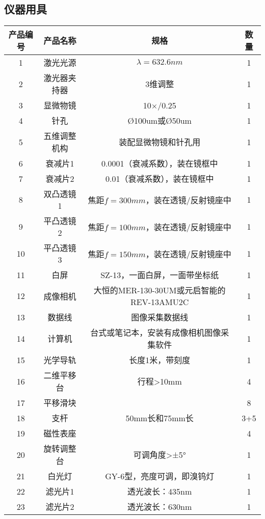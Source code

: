 \documentclass[dvipsnames, svgnames,a4paper,11pt]{article}
\begin{document}
	\subsection{仪器用具}
	\begin{table}[htbp]
		\centering
		\begin{tabular}{|c|c|c|c|}
			\hline
			产品编号 & 产品名称 & 规格 & 数量 \\
			\hline
			1 & 激光光源 & $\lambda =632.6nm$ & 1 \\
			2 & 激光器夹持器 & 3维调整 & 1 \\
			3 & 显微物镜 & 10×/0.25 & 1 \\
			4 & 针孔 & Ø100um或Ø50um & 1 \\
			5 & 五维调整机构 & 装配显微物镜和针孔用 & 1 \\
			6 & 衰减片1 & 0.0001（衰减系数），装在镜框中 & 1 \\
			7 & 衰减片2 & 0.01（衰减系数），装在镜框中 & 1 \\
			8 & 双凸透镜1 & 焦距$f=300mm$，装在透镜/反射镜座中 & 1 \\
			9 & 平凸透镜2 & 焦距$f=100mm$，装在透镜/反射镜座中 & 1 \\
			10 & 平凸透镜3 & 焦距$f=150mm$，装在透镜/反射镜座中 & 1 \\
			11 & 白屏 & SZ-13，一面白屏，一面带坐标纸 & 1 \\
			12 & 成像相机 & 大恒的MER-130-30UM或元启智能的REV-13AMU2C & 1 \\
			13 & 数据线 & 图像采集数据线 & 1 \\
			14 & 计算机 & 台式或笔记本，安装有成像相机图像采集软件 & 1 \\
			15 & 光学导轨 & 长度1米，带刻度 & 1 \\
			16 & 二维平移台 & 行程>10mm & 4 \\
			17 & 平移滑块 & & 8 \\
			18 & 支杆 & 50mm长和75mm长 & 3+5 \\
			19 & 磁性表座 & & 4 \\
			20 & 旋转调整台 & 可调角度>±5° & 1 \\
			21 & 白光灯 & GY-6型，亮度可调，即溴钨灯 & 1 \\
			22 & 滤光片1 & 透光波长：435nm & 1 \\
			23 & 滤光片2 & 透光波长：630nm & 1 \\
			\hline
		\end{tabular}
	\end{table}
	
\end{document}
